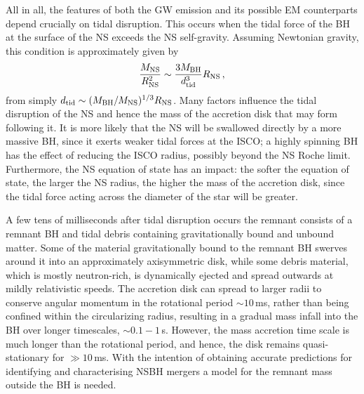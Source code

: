 \documentclass[binding=0.6cm, LaM]{sapthesis}
\begin{document}
        All in all, the features of both the GW emission and its possible EM counterparts depend crucially on tidal disruption.
        This occurs when the tidal force of the BH at the surface of the NS exceeds 
        the NS self-gravity. Assuming Newtonian gravity, this condition is approximately given by
        \begin{equation}
          {{M_{\rm NS}} \over {R_{\rm NS}^2}} \sim {{3M_{\rm BH}} \over {d_{\rm tid}^3}}R_{\rm NS}\,,
        \end{equation}
        from simply $d_{\rm tid} \sim (M_{\rm BH}/M_{\rm NS})^{1/3}R_{\rm NS}$.
	Many factors influence the tidal disruption of the NS and hence the mass of the accretion disk that may form following it. 
	It is more likely that the NS will be swallowed directly by a more massive BH, 
	since it exerts weaker tidal forces at the ISCO;
	a highly  spinning BH has the effect of reducing the ISCO radius,
	possibly beyond the NS Roche limit.
	Furthermore, the NS equation of state has an impact:
	the softer the equation of state, the larger the NS radius, the higher the mass of the accretion disk,
	since the tidal force acting across the diameter of the star will be greater.

        A few tens of milliseconds after tidal disruption occurs the remnant consists of
        a remnant BH and tidal debris containing gravitationally bound and unbound matter.
        Some of the material gravitationally bound to the remnant BH swerves
        around it into an approximately axisymmetric disk, while some debris material,
        which is mostly neutron-rich, is dynamically ejected and spread outwards at mildly relativistic speeds.
	The accretion disk can spread to larger radii to conserve angular momentum in the rotational period $\sim 10\,$ms,
        rather than being confined within the circularizing radius, resulting in a gradual mass infall into the BH over longer timescales, $\sim 0.1-1\,$s.
        However, the mass accretion time scale is much longer than the rotational period, and hence, the disk remains quasi-stationary for $\gg 10\,$ms.
        With the intention of obtaining accurate predictions for identifying and characterising NSBH mergers
        a model for the remnant mass outside the BH is needed.
\end{document}
